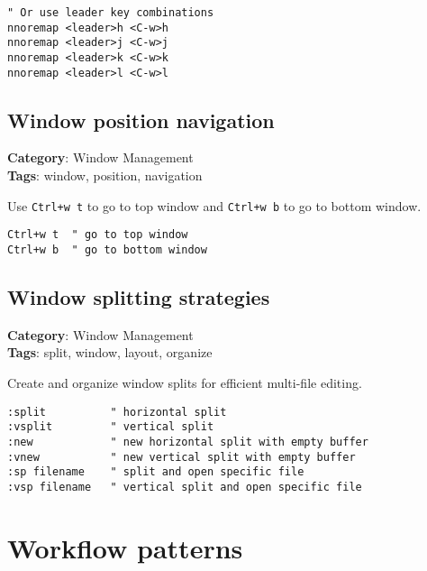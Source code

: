 {{{{{{{{{{{{{{{{{{\begin{Exa*}{}
\begin{Verbatim}[fontsize=\footnotesize, breaklines, breakanywhere]
" Or use leader key combinations
nnoremap <leader>h <C-w>h
nnoremap <leader>j <C-w>j
nnoremap <leader>k <C-w>k
nnoremap <leader>l <C-w>l
\end{Verbatim}
\end{Exa*}

\section{Window position navigation}

\textbf{Category}: Window Management\\ \textbf{Tags}: window, position, navigation
\vspace{0.5cm}

Use {\footnotesize \Verb§Ctrl+w t§} to go to top window and {\footnotesize \Verb§Ctrl+w b§} to go to bottom window.

\begin{Exa*}{}
\begin{Verbatim}[fontsize=\footnotesize, breaklines, breakanywhere]
Ctrl+w t  " go to top window
Ctrl+w b  " go to bottom window
\end{Verbatim}
\end{Exa*}

\section{Window splitting strategies}

\textbf{Category}: Window Management\\ \textbf{Tags}: split, window, layout, organize
\vspace{0.5cm}

Create and organize window splits for efficient multi-file editing.

\begin{Exa*}{}
\begin{Verbatim}[fontsize=\footnotesize, breaklines, breakanywhere]
:split          " horizontal split
:vsplit         " vertical split
:new            " new horizontal split with empty buffer
:vnew           " new vertical split with empty buffer
:sp filename    " split and open specific file
:vsp filename   " vertical split and open specific file
\end{Verbatim}
\end{Exa*}

\chapter{Workflow patterns}
}}}}}}}}}}}}}}}}}}
